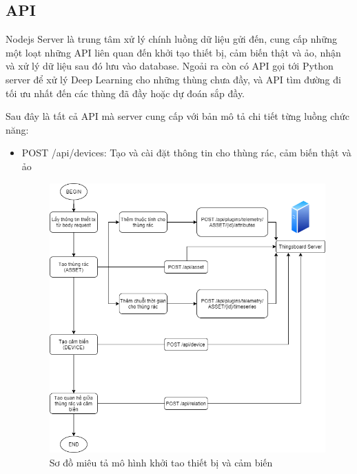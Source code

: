 \subsection{API}
Nodejs Server là trung tâm xử lý chính luồng dữ liệu gửi đến, cung cấp những một loạt những API liên quan đến khởi tạo thiết bị, cảm biến thật và ảo, nhận và xử lý dữ liệu sau đó lưu vào database. Ngoải ra còn có API gọi tới Python server để xử lý Deep Learning cho những thùng chưa đầy, và API tìm đường đi tối ưu nhất đến các thùng đã đầy hoặc dự đoán sắp đầy.

Sau đây là tất cả API mà server cung cấp với bản mô tả chi tiết từng luồng chức năng:
\begin{itemize}
    \item POST /api/devices: Tạo và cài đặt thông tin cho thùng rác, cảm biến thật và ảo
    \begin{itemize}
        \begin{figure}[H]
            \centering
            \includegraphics[width=\textwidth]{images/Khanh/Nodejs/Server_Create_Stimulate_Device.png}
            \caption{Sơ đồ miêu tả mô hình khởi tao thiết bị và cảm biến}

\end{figure}
\end{itemize}
\end{itemize}
